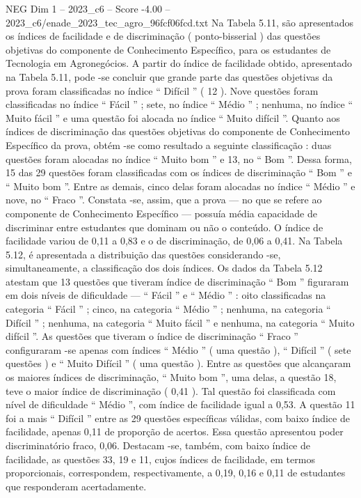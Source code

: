 \begin{textsample}{NEG Dim 1 – 2023\_c6 – Score -4.00 – 2023\_c6/enade\_2023\_tec\_agro\_96fcf06fcd.txt}
Na Tabela 5.11, são apresentados os índices de facilidade e de discriminação ( ponto-bisserial ) das questões objetivas do componente de Conhecimento Específico, para os estudantes de Tecnologia em Agronegócios.
A partir do índice de facilidade obtido, apresentado na Tabela 5.11, pode -se concluir que grande parte das questões objetivas da prova foram classificadas no índice “ Difícil ” ( 12 ).
Nove questões foram classificadas no índice “ Fácil ” ; sete, no índice “ Médio ” ; nenhuma, no índice “ Muito fácil ” e uma questão foi alocada no índice “ Muito difícil ”.
Quanto aos índices de discriminação das questões objetivas do componente de Conhecimento Específico da prova, obtém -se como resultado a seguinte classificação : duas questões foram alocadas no índice “ Muito bom ” e 13, no “ Bom ”.
Dessa forma, 15 das 29 questões foram classificadas com os índices de discriminação “ Bom ” e “ Muito bom ”.
Entre as demais, cinco delas foram alocadas no índice “ Médio ” e nove, no “ Fraco ”.
Constata -se, assim, que a prova — no que se refere ao componente de Conhecimento Específico — possuía média capacidade de discriminar entre estudantes que dominam ou não o conteúdo.
O índice de facilidade variou de 0,11 a 0,83 e o de discriminação, de 0,06 a 0,41.
Na Tabela 5.12, é apresentada a distribuição das questões considerando -se, simultaneamente, a classificação dos dois índices.
Os dados da Tabela 5.12 atestam que 13 questões que tiveram índice de discriminação “ Bom ” figuraram em dois níveis de dificuldade — “ Fácil ” e “ Médio ” : oito classificadas na categoria “ Fácil ” ; cinco, na categoria “ Médio ” ; nenhuma, na categoria “ Difícil ” ; nenhuma, na categoria “ Muito fácil ” e nenhuma, na categoria “ Muito difícil ”.
As questões que tiveram o índice de discriminação “ Fraco ” configuraram -se apenas com índices “ Médio ” ( uma questão ), “ Difícil ” ( sete questões ) e “ Muito Difícil ” ( uma questão ).
Entre as questões que alcançaram os maiores índices de discriminação, “ Muito bom ”, uma delas, a questão 18, teve o maior índice de discriminação ( 0,41 ).
Tal questão foi classificada com nível de dificuldade “ Médio ”, com índice de facilidade igual a 0,53.
A questão 11 foi a mais “ Difícil ” entre as 29 questões específicas válidas, com baixo índice de facilidade, apenas 0,11 de proporção de acertos.
Essa questão apresentou poder discriminatório fraco, 0,06.
Destacam -se, também, com baixo índice de facilidade, as questões 33, 19 e 11, cujos índices de facilidade, em termos proporcionais, correspondem, respectivamente, a 0,19, 0,16 e 0,11 de estudantes que responderam acertadamente.

\end{textsample}
